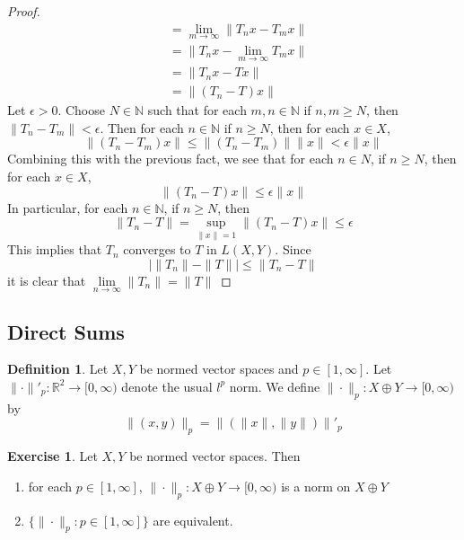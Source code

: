 \documentclass[12pt]{amsart}
\theoremstyle{definition}
\newtheorem{defn}[definition]{Definition}
\newtheorem{ex}[definition]{Exercise}
\newcommand{\ep}{\epsilon}
\newcommand{\N}{\mathbb{N}}
\newcommand{\R}{\mathbb{R}}
\newcommand{\Rg}{[0,\infty)}
\newcommand{\limn}{\lim \limits_{n \rightarrow \infty}}
\newcommand{\lex}[1]{\label{ex:#1}}
\newcommand{\ld}[1]{\label{defn:#1}}
\begin{document}
\begin{proof}
\begin{align*}
			&= \lim_{m \rightarrow \infty} \|T_nx-T_mx \|\\
			&= \|T_nx-\lim_{m \rightarrow \infty}T_mx \|\\
			&=\|T_nx-Tx \|\\
			&= \|(T_n-T)x \|
		\end{align*} 
		Let $\ep >0 $. Choose $N \in \N$ such that for each $m, n \in \N$ if $n,m \geq N$, then $\|T_n - T_m \|< \ep$. Then for each $n \in \N$ if $n \geq N$, then for each $x \in X$, $$\|(T_n-T_m)x\|\leq \|(T_n-T_m)\|\|x \|< \ep \|x\|$$ Combining this with the previous fact, we see that for each $n \in N$, if $n \geq N$, then for each $x \in X$, $$\|(T_n -T) x\|\leq \ep \|x \|$$ In particular, for each $n \in \N$, if $n \geq N$, then $$ \|T_n -T \|= \sup\limits_{\|x \|= 1}\|(T_n - T)x \|\leq \ep$$ This implies that $T_n$ converges to $T$ in $L(X,Y)$. 
		Since $$\big\vert \|T_n \|- \|T \|\big \vert \leq \|T_n - T \|$$ it is clear that $\limn \|T_n \|= \|T \|$
	\end{proof}
	
	
	
	
	
	
	
	
	
	
	
	
	
	
	
	
	
	
	
	
	
	
	
	
	\newpage
	\subsection{Direct Sums}
	
	\begin{defn} \ld{}
	Let $X, Y$ be normed vector spaces and $p \in [1, \infty]$. Let $\| \cdot \|'_p: \R^2 \rightarrow [0, \infty)$ denote the usual $l^p$ norm. We define $\| \cdot \|_p : X \oplus Y \rightarrow \Rg$ by $$\|(x, y) \|_p = \|( \|x\|, \| y \|) \|'_ p$$
	\end{defn}
	
	\begin{ex} \lex{}	
	Let $X, Y$  be normed vector spaces. Then 
	\begin{enumerate}
	\item for each $p \in [1, \infty]$, $\|\cdot\|_p: X \oplus Y \rightarrow \Rg$ is a norm on $X \oplus Y$
	\item  $\{\|\cdot \|_p:  p \in [1, \infty]\}$ are equivalent. 
	\end{enumerate}
	\end{ex}
	
\end{document}

